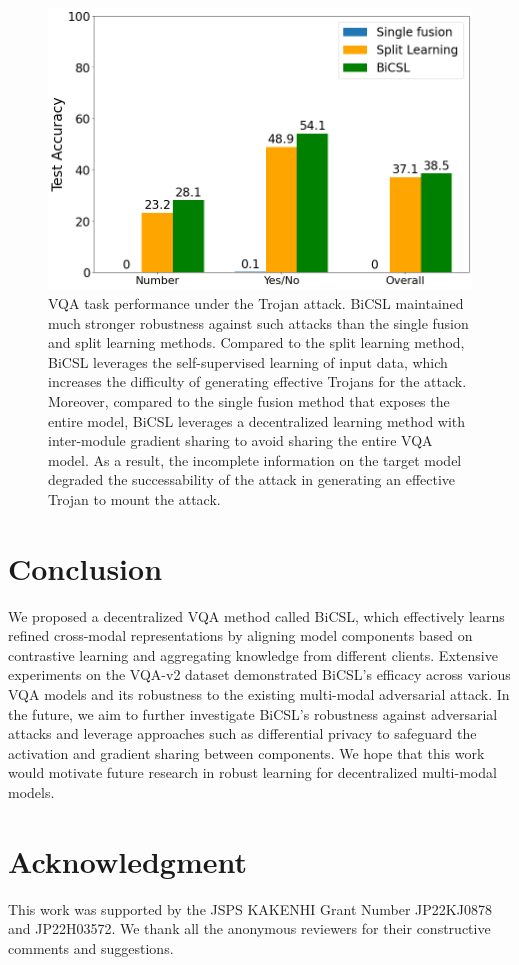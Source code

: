 \documentclass[letterpaper]{article} %
\begin{document}
\begin{figure}[!t]
    \centering
    \includegraphics[width=0.9\linewidth]{figures/robustness.png}
    \caption{VQA task performance under the Trojan attack. BiCSL maintained much stronger robustness against such attacks than the single fusion and split learning methods. Compared to the split learning method, BiCSL leverages the self-supervised learning of input data, which increases the difficulty of generating effective Trojans for the attack. Moreover, compared to the single fusion method that exposes the entire model, BiCSL leverages a decentralized learning method with inter-module gradient sharing to avoid sharing the entire VQA model. As a result, the incomplete information on the target model degraded the successability of the attack in generating an effective Trojan to mount the attack.}
    \label{fig:robustness}
\end{figure}


\section{Conclusion}
We proposed a decentralized VQA method called BiCSL, which effectively learns refined cross-modal representations by aligning model components based on contrastive learning and aggregating knowledge from different clients. Extensive experiments on the VQA-v2 dataset demonstrated BiCSL's efficacy across various VQA models and its robustness to the existing multi-modal adversarial attack. In the future, we aim to further investigate BiCSL's robustness against adversarial attacks and leverage approaches such as differential privacy \cite{dp} to safeguard the activation and gradient sharing between components. We hope that this work would motivate future research in robust learning for decentralized multi-modal models.

\section*{Acknowledgment}
This work was supported by the JSPS KAKENHI Grant Number JP22KJ0878 and JP22H03572. We thank all the anonymous reviewers for their constructive comments and suggestions.


\end{document}
